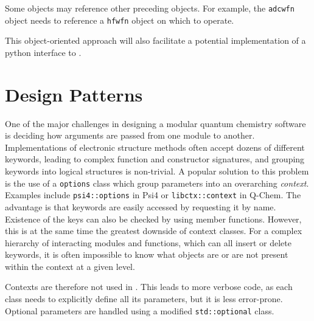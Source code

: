 \noindent Some objects may reference other preceding objects. For example, the \texttt{adcwfn} object needs to reference a \texttt{hfwfn} object on which to operate.

This object-oriented approach will also facilitate a potential implementation of a python interface to \mchem{}.

\section{Design Patterns}

One of the major challenges in designing a modular quantum chemistry software is deciding how arguments are passed from one module to another. Implementations of electronic structure methods often accept dozens of different keywords, leading to complex function and constructor signatures, and grouping keywords into logical structures is non-trivial. A popular solution to this problem is the use of a \texttt{options} class which group parameters into an overarching \emph{context}. Examples include \texttt{psi4::options} in Psi4 or \texttt{libctx::context} in Q-Chem. The advantage is that keywords are easily accessed by requesting it by name. Existence of the keys can also be checked by using member functions. However, this is at the same time the greatest downside of context classes. For a complex hierarchy of interacting modules and functions, which can all insert or delete keywords, it is often impossible to know what  objects are or are not present within the context at a given level. 

Contexts are therefore not used in \mchem{}. This leads to more verbose code, as each class needs to explicitly define all its parameters, but it is less error-prone. Optional parameters are handled using a modified \texttt{std::optional} class.

